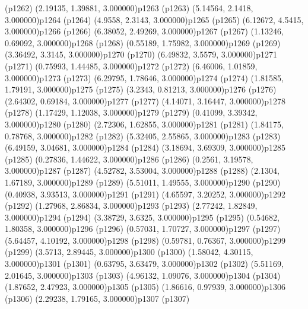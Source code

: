\psdot(p1262)
\psPoint(2.19135, 1.39881, 3.000000){p1263}
\psdot(p1263)
\psPoint(5.14564, 2.1418, 3.000000){p1264}
\psdot(p1264)
\psPoint(4.9558, 2.3143, 3.000000){p1265}
\psdot(p1265)
\psPoint(6.12672, 4.5415, 3.000000){p1266}
\psdot(p1266)
\psPoint(6.38052, 2.49269, 3.000000){p1267}
\psdot(p1267)
\psPoint(1.13246, 0.69092, 3.000000){p1268}
\psdot(p1268)
\psPoint(0.55189, 1.75982, 3.000000){p1269}
\psdot(p1269)
\psPoint(3.36492, 3.3145, 3.000000){p1270}
\psdot(p1270)
\psPoint(6.49832, 3.5579, 3.000000){p1271}
\psdot(p1271)
\psPoint(0.75993, 1.44485, 3.000000){p1272}
\psdot(p1272)
\psPoint(6.46006, 1.01859, 3.000000){p1273}
\psdot(p1273)
\psPoint(6.29795, 1.78646, 3.000000){p1274}
\psdot(p1274)
\psPoint(1.81585, 1.79191, 3.000000){p1275}
\psdot(p1275)
\psPoint(3.2343, 0.81213, 3.000000){p1276}
\psdot(p1276)
\psPoint(2.64302, 0.69184, 3.000000){p1277}
\psdot(p1277)
\psPoint(4.14071, 3.16447, 3.000000){p1278}
\psdot(p1278)
\psPoint(1.17429, 1.12038, 3.000000){p1279}
\psdot(p1279)
\psPoint(0.41099, 3.39342, 3.000000){p1280}
\psdot(p1280)
\psPoint(2.72306, 1.62855, 3.000000){p1281}
\psdot(p1281)
\psPoint(1.84175, 0.78768, 3.000000){p1282}
\psdot(p1282)
\psPoint(5.32405, 2.55865, 3.000000){p1283}
\psdot(p1283)
\psPoint(6.49159, 3.04681, 3.000000){p1284}
\psdot(p1284)
\psPoint(3.18694, 3.69309, 3.000000){p1285}
\psdot(p1285)
\psPoint(0.27836, 1.44622, 3.000000){p1286}
\psdot(p1286)
\psPoint(0.2561, 3.19578, 3.000000){p1287}
\psdot(p1287)
\psPoint(4.52782, 3.53004, 3.000000){p1288}
\psdot(p1288)
\psPoint(2.1304, 1.67189, 3.000000){p1289}
\psdot(p1289)
\psPoint(5.51011, 1.49555, 3.000000){p1290}
\psdot(p1290)
\psPoint(0.40938, 3.93513, 3.000000){p1291}
\psdot(p1291)
\psPoint(4.65597, 3.20252, 3.000000){p1292}
\psdot(p1292)
\psPoint(1.27968, 2.86834, 3.000000){p1293}
\psdot(p1293)
\psPoint(2.77242, 1.82849, 3.000000){p1294}
\psdot(p1294)
\psPoint(3.38729, 3.6325, 3.000000){p1295}
\psdot(p1295)
\psPoint(0.54682, 1.80358, 3.000000){p1296}
\psdot(p1296)
\psPoint(0.57031, 1.70727, 3.000000){p1297}
\psdot(p1297)
\psPoint(5.64457, 4.10192, 3.000000){p1298}
\psdot(p1298)
\psPoint(0.59781, 0.76367, 3.000000){p1299}
\psdot(p1299)
\psPoint(3.5713, 2.89445, 3.000000){p1300}
\psdot(p1300)
\psPoint(1.58042, 4.30115, 3.000000){p1301}
\psdot(p1301)
\psPoint(0.63795, 3.63479, 3.000000){p1302}
\psdot(p1302)
\psPoint(5.51169, 2.01645, 3.000000){p1303}
\psdot(p1303)
\psPoint(4.96132, 1.09076, 3.000000){p1304}
\psdot(p1304)
\psPoint(1.87652, 2.47923, 3.000000){p1305}
\psdot(p1305)
\psPoint(1.86616, 0.97939, 3.000000){p1306}
\psdot(p1306)
\psPoint(2.29238, 1.79165, 3.000000){p1307}
\psdot(p1307)
